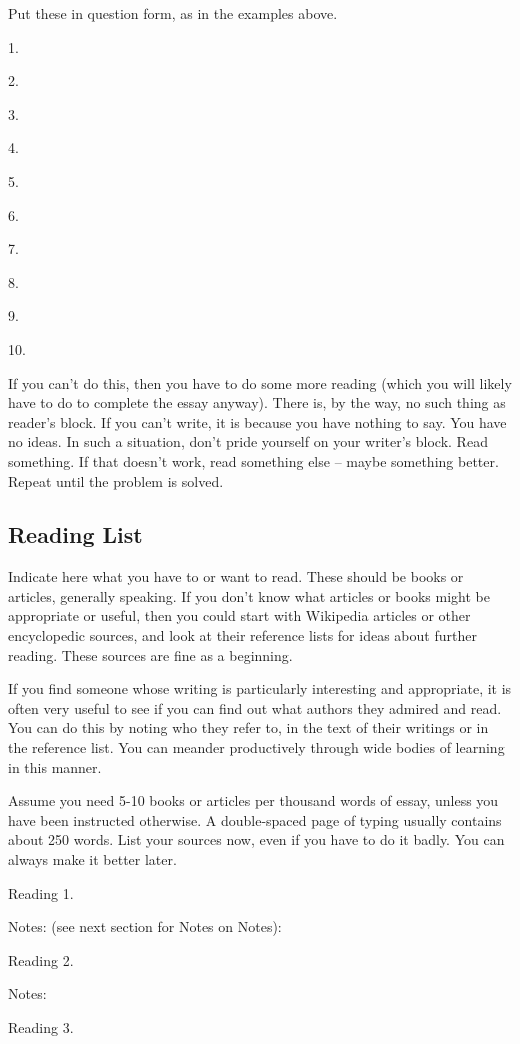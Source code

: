 \documentclass{article}
\begin{document}
Put these in question form, as in the examples above.

1.

2.

3.

4.

5.

6.

7.

8.

9.

10.

If you can't do this, then you have to do some more reading (which you
will likely have to do to complete the essay anyway). There is, by the
way, no such thing as reader's block. If you can't write, it is because
you have nothing to say. You have no ideas. In such a situation, don't
pride yourself on your writer's block. Read something. If that doesn't
work, read something else -- maybe something better. Repeat until the
problem is solved.

\subsection{Reading List}

Indicate here what you have to or want to read. These should be books or
articles, generally speaking. If you don't know what articles or books
might be appropriate or useful, then you could start with Wikipedia
articles or other encyclopedic sources, and look at their reference
lists for ideas about further reading. These sources are fine as a
beginning.

If you find someone whose writing is particularly interesting and
appropriate, it is often very useful to see if you can find out what
authors they admired and read. You can do this by noting who they refer
to, in the text of their writings or in the reference list. You can
meander productively through wide bodies of learning in this manner.

Assume you need 5-10 books or articles per thousand words of essay,
unless you have been instructed otherwise. A double-spaced page of
typing usually contains about 250 words. List your sources now, even if
you have to do it badly. You can always make it better later.

Reading 1.

Notes: (see next section for Notes on Notes):

Reading 2.

Notes:

Reading 3.
\end{document}
